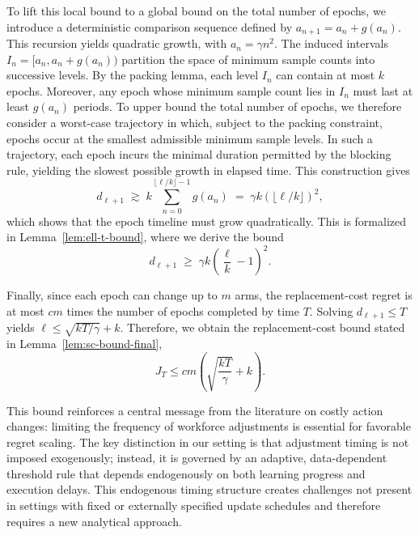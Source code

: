 \documentclass[opre,blindrev]{informs3}
\begin{document}
\begin{APPENDICES}
To lift this local bound to a global bound on the total number of epochs, we introduce a deterministic comparison sequence defined by \(a_{n+1}=a_n+g(a_n)\). This recursion yields quadratic growth, with \(a_n=\gamma n^2\). The induced intervals \(I_n=[a_n, a_n+g(a_n))\) partition the space of minimum sample counts into successive levels. By the packing lemma, each level \(I_n\) can contain at most \(k\) epochs. Moreover, any epoch whose minimum sample count lies in \(I_n\) must last at least \(g(a_n)\) periods. To upper bound the total number of epochs, we therefore consider a worst-case trajectory in which, subject to the packing constraint, epochs occur at the smallest admissible minimum sample levels. In such a trajectory, each epoch incurs the minimal duration permitted by the blocking rule, yielding the slowest possible growth in elapsed time. This construction gives
\[
    d_{\ell+1}
    \;\gtrsim\;
    k \sum_{n=0}^{\lfloor \ell/k\rfloor-1} g(a_n)
    \;=\;
    \gamma k \left(\lfloor \ell/k\rfloor\right)^2,
\]
which shows that the epoch timeline must grow quadratically. This is formalized in Lemma~\ref{lem:ell-t-bound}, where we derive the bound
\[
    d_{\ell+1}
    \;\ge\;
    \gamma k \left(\frac{\ell}{k}-1\right)^2.
\]

Finally, since each epoch can change up to \(m\) arms, the replacement-cost regret is at most \(cm\) times the number of epochs completed by time \(T\). Solving \(d_{\ell+1} \leq T\) yields \(\ell \leq \sqrt{kT/\gamma} + k\). Therefore, we obtain the replacement-cost bound stated in Lemma~\ref{lem:sc-bound-final},
\[
    J_T \leq cm\left(\sqrt{\frac{kT}{\gamma}} + k\right).
\]

This bound reinforces a central message from the literature on costly action changes: limiting the frequency of workforce adjustments is essential for favorable regret scaling. The key distinction in our setting is that adjustment timing is not imposed exogenously; instead, it is governed by an adaptive, data-dependent threshold rule that depends endogenously on both learning progress and execution delays. This endogenous timing structure creates challenges not present in settings with fixed or externally specified update schedules and therefore requires a new analytical approach.


\end{APPENDICES}
\end{document}
